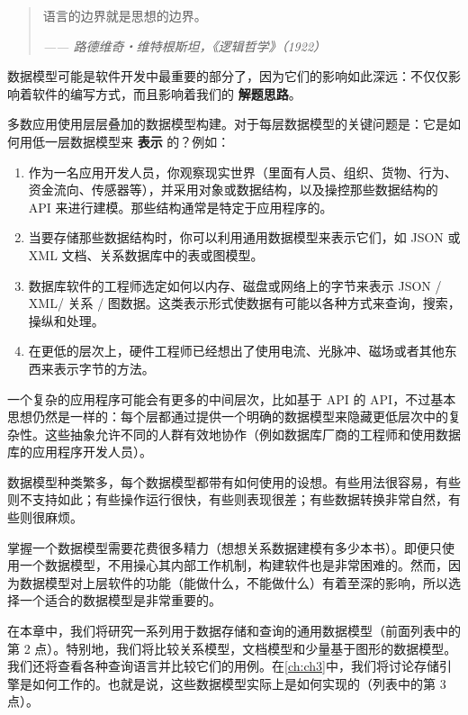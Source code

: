 \begin{quote}
    语言的边界就是思想的边界。

    \textit{—— 路德维奇・维特根斯坦，《逻辑哲学》（1922）}
\end{quote}

数据模型可能是软件开发中最重要的部分了，因为它们的影响如此深远：不仅仅影响着软件的编写方式，而且影响着我们的 \textbf{解题思路}。

多数应用使用层层叠加的数据模型构建。对于每层数据模型的关键问题是：它是如何用低一层数据模型来 \textbf{表示} 的？例如：

\begin{enumerate}
    \item 作为一名应用开发人员，你观察现实世界（里面有人员、组织、货物、行为、资金流向、传感器等），并采用对象或数据结构，以及操控那些数据结构的 API 来进行建模。那些结构通常是特定于应用程序的。
    \item 当要存储那些数据结构时，你可以利用通用数据模型来表示它们，如 JSON 或 XML 文档、关系数据库中的表或图模型。
    \item 数据库软件的工程师选定如何以内存、磁盘或网络上的字节来表示 JSON / XML/ 关系 / 图数据。这类表示形式使数据有可能以各种方式来查询，搜索，操纵和处理。
    \item 在更低的层次上，硬件工程师已经想出了使用电流、光脉冲、磁场或者其他东西来表示字节的方法。
\end{enumerate}

一个复杂的应用程序可能会有更多的中间层次，比如基于 API 的 API，不过基本思想仍然是一样的：每个层都通过提供一个明确的数据模型来隐藏更低层次中的复杂性。这些抽象允许不同的人群有效地协作（例如数据库厂商的工程师和使用数据库的应用程序开发人员）。

数据模型种类繁多，每个数据模型都带有如何使用的设想。有些用法很容易，有些则不支持如此；有些操作运行很快，有些则表现很差；有些数据转换非常自然，有些则很麻烦。

掌握一个数据模型需要花费很多精力（想想关系数据建模有多少本书）。即便只使用一个数据模型，不用操心其内部工作机制，构建软件也是非常困难的。然而，因为数据模型对上层软件的功能（能做什么，不能做什么）有着至深的影响，所以选择一个适合的数据模型是非常重要的。

在本章中，我们将研究一系列用于数据存储和查询的通用数据模型（前面列表中的第 2 点）。特别地，我们将比较关系模型，文档模型和少量基于图形的数据模型。我们还将查看各种查询语言并比较它们的用例。在\autoref{ch:ch3}中，我们将讨论存储引擎是如何工作的。也就是说，这些数据模型实际上是如何实现的（列表中的第 3 点）。


